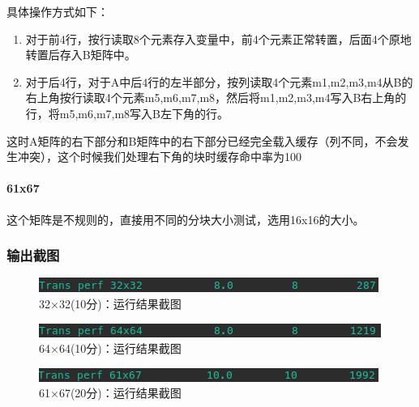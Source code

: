 具体操作方式如下：

\begin{enumerate}
    \item 对于前4行，按行读取8个元素存入变量中，前4个元素正常转置，后面4个原地转置后存入B矩阵中。
    \item 对于后4行，对于A中后4行的左半部分，按列读取4个元素m1,m2,m3,m4从B的右上角按行读取4个元素m5,m6,m7,m8，然后将m1,m2,m3,m4写入B右上角的行，将m5,m6,m7,m8写入B左下角的行。
\end{enumerate}

这时A矩阵的右下部分和B矩阵中的右下部分已经完全载入缓存（列不同，不会发生冲突），这个时候我们处理右下角的块时缓存命中率为100%

\paragraph{61x67}
这个矩阵是不规则的，直接用不同的分块大小测试，选用16x16的大小。

\subsubsection{输出截图}

\begin{figure}[H]
    \centering
    \includegraphics[width=0.7\linewidth]{figures/Trans_1}
    \caption{32×32(10分)：运行结果截图}
    \label{fig:trans1}
\end{figure}

\begin{figure}[H]
    \centering
    \includegraphics[width=0.7\linewidth]{figures/Trans_2}
    \caption{64×64(10分)：运行结果截图}
    \label{fig:trans2}
\end{figure}

\begin{figure}[H]
    \centering
    \includegraphics[width=0.7\linewidth]{figures/Trans_3}
    \caption{61×67(20分)：运行结果截图}
    \label{fig:trans3}
\end{figure}
